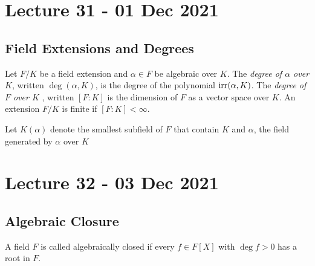 \documentclass[11pt]{scrartcl}
\begin{document}
\section{Lecture 31 - 01 Dec 2021}

\subsection{Field Extensions and Degrees}

\begin{definition}
  Let $F/K$ be a field extension and $\alpha\in F$ be algebraic over $K$. The
  \emph{degree of $\alpha$ over $K$}, written $\deg(\alpha, K)$, is the degree of the
  polynomial $\operatorname{irr}(\alpha, K)$.
  The \emph{degree of $F$ over $K$ }, written $[F:K]$ is the dimension of $F$ as a vector
  space over $K$. An extension $F/K$ is finite if $[F:K]<\infty$.
\end{definition}

\begin{definition}
  Let $K(\alpha)$ denote the smallest subfield of $F$ that contain $K$ and $\alpha$, the
  field generated by $\alpha$ over $K$
\end{definition}

\section{Lecture 32 - 03 Dec 2021}

\subsection{Algebraic Closure}

\begin{definition}
  A field $F$ is called algebraically closed if every $f\in F[X]$ with $\deg f>0$ has a
  root in $F$.
  \label{<+label+>}
\end{definition}
\end{document}
